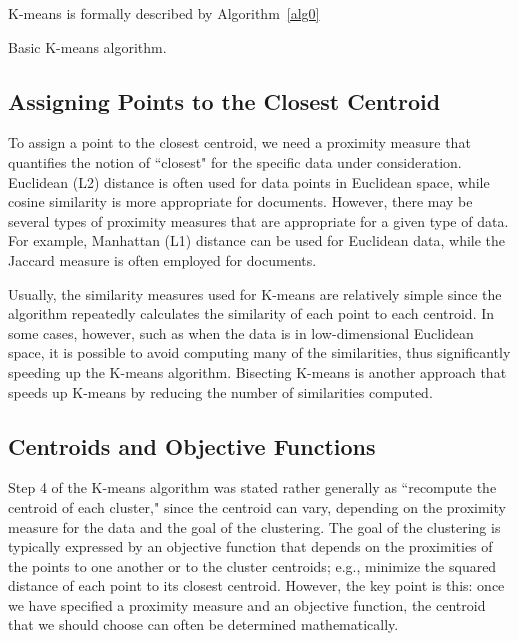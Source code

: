 K-means is formally described by Algorithm~\ref{alg0}

\begin{algorithm}
  \caption{Basic K-means algorithm.}
  \label{alg0}
  \begin{algorithmic}
    
  \end{algorithmic}
\end{algorithm}

\subsection{Assigning Points to the Closest Centroid}
To assign a point to the closest centroid, we need a proximity measure that
quantifies the notion of ``closest" for the specific data under consideration.
Euclidean (L2) distance is often used for data points in Euclidean space, while
cosine similarity is more appropriate for documents.  However, there may be
several types of proximity measures that are appropriate for a given type of
data. For example, Manhattan (L1) distance can be used for Euclidean data,
while the Jaccard measure is often employed for documents.

Usually, the similarity measures used for K-means are relatively simple
since the algorithm repeatedly calculates the similarity of each point to each
centroid. In some cases, however, such as when the data is in low-dimensional
Euclidean space, it is possible to avoid computing many of the similarities,
thus significantly speeding up the K-means algorithm.   Bisecting K-means
is another approach that speeds up K-means by reducing the number of similarities computed.

\subsection{Centroids and Objective Functions}
Step 4 of the K-means algorithm was stated rather generally as ``recompute
the centroid of each cluster," since the centroid can vary, depending on the
proximity measure for the data and the goal of the clustering.  The goal of
the clustering is typically expressed by an objective function that depends on
the proximities of the points to one another or to the cluster centroids; e.g.,
minimize the squared distance of each point to its closest centroid. However,
the key point is this: once we have
specified a proximity measure and an objective function, the centroid that we
should choose can often be determined mathematically.

